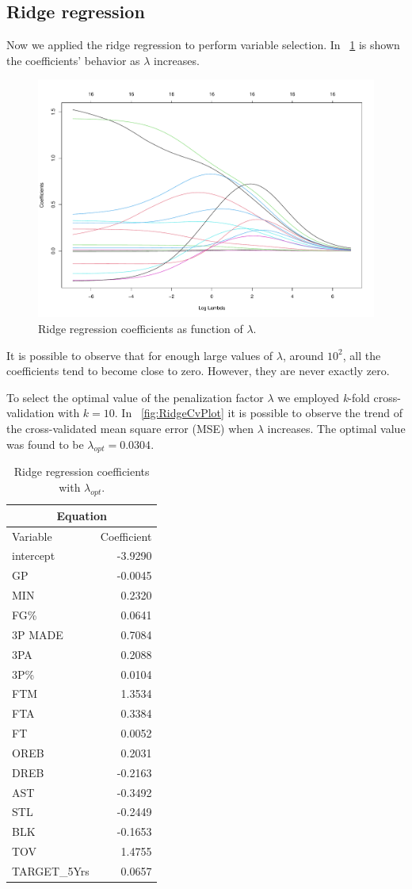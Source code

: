 \subsection{Ridge regression}

Now we applied the ridge regression to perform variable selection. In \Fig~\ref{fig:RidgeCoefVsLambda} is shown the coefficients' behavior as $\lambda$ increases. 

\begin{figure}[h]
	\centering
	\includegraphics[width=0.4\linewidth]{ImageFiles/Regression/Ridge/RidgeCoefVsLambda}
	\caption{Ridge regression coefficients as function of $\lambda$.}
	\label{fig:RidgeCoefVsLambda}
\end{figure}

It is possible to observe that for enough large values of $\lambda$, around $10^2$, all the coefficients tend to become close to zero. However, they are never exactly zero.

To select the optimal value of the penalization factor $\lambda$ we employed \textit{k}-fold cross-validation with $\textit{k}=10$. In \Fig~\ref{fig:RidgeCvPlot} it is possible to observe the trend of the cross-validated mean square error (MSE) when $\lambda$ increases. The optimal value was found to be $\lambda_{opt} = 0.0304$.

\begin{table}[H]
	\centering
	\begin{tabular}{|| l | r ||} 
		\hline
		\multicolumn{2}{|c|}{Equation} \\
		\hline
		Variable & Coefficient \\
		\hline
		intercept & -3.9290 \\
		GP & -0.0045 \\
		MIN & 0.2320 \\
		FG\% & 0.0641 \\
		3P MADE & 0.7084 \\
		3PA & 0.2088 \\
		3P\% & 0.0104 \\
		FTM & 1.3534 \\
		FTA & 0.3384 \\
		FT & 0.0052 \\
		OREB & 0.2031 \\
		DREB & -0.2163 \\
		AST & -0.3492 \\			
		STL & -0.2449 \\
		BLK & -0.1653 \\
		TOV & 1.4755 \\
		TARGET\_5Yrs & 0.0657 \\				
		\hline
	\end{tabular}
	\caption{Ridge regression coefficients with $\lambda_{opt}$.}
	\label{table:FinalRidgeCoef}
\end{table}


